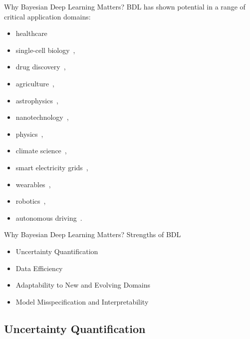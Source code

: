 \documentclass[9pt,handout]{beamer}
\begin{document}
\begin{frame}{Why Bayesian Deep Learning Matters?}
BDL has shown potential in a range of critical application domains:
\begin{itemize}
	\item healthcare~\citep{peng2019bayesian, abdar2021uncertainty} %
	\item single-cell biology~\citep{way2018bayesian}, 
	\item drug discovery~\citep{gruver2021effective,klarner2023qsavi}, 
	\item agriculture~\citep{hernandez2020uncertainty}, 
	\item astrophysics~\citep{soboczenski2018bayesian, ferreira2020galaxy}, 
	\item nanotechnology~\citep{leitherer2021robust}, 
	\item physics~\citep{cranmer2021bayesian}, 
	\item climate science~\citep{vandal2018quantifying, luo2022bayesian}, 
	\item smart electricity grids~\citep{yang2019bayesian}, 
	\item wearables~\citep{manogaran2019wearable, zhou2020human}, 
	\item robotics~\citep{shi2021bayesian, mur2023bayesian},
	\item autonomous driving~\citep{mcallister2017concrete}. 
\end{itemize}
\end{frame}


\begin{frame}{Why Bayesian Deep Learning Matters?}
\alert{Strengths of BDL}
\begin{itemize}[<+->]
	\item Uncertainty Quantification
	\item Data Efficiency
	\item Adaptability to New and Evolving Domains
	\item Model Misspecification and Interpretability
\end{itemize}
\end{frame}


\subsection{Uncertainty Quantification}
\end{document}
